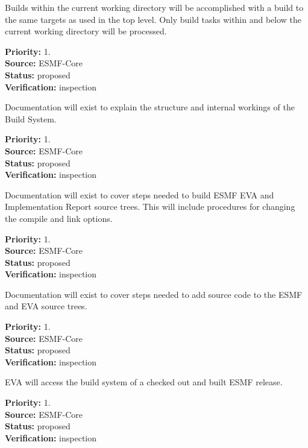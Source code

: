 Builds within the current working directory will be
accomplished with a build to the same targets as
used in the top level.
Only build tasks within and below the current working directory
will be processed.  
\begin{reqlist}
{\bf Priority:} 1. \\
{\bf Source:} ESMF-Core \\
{\bf Status:} proposed \\
{\bf Verification:} inspection
\end{reqlist}

Documentation will exist to explain the structure and 
internal workings of the Build System.
\begin{reqlist}
{\bf Priority:} 1. \\
{\bf Source:} ESMF-Core \\
{\bf Status:} proposed \\
{\bf Verification:} inspection
\end{reqlist}

Documentation will exist to cover steps needed to build ESMF
EVA and Implementation Report  source trees.  This will include procedures for 
changing the compile and link options.
\begin{reqlist}
{\bf Priority:} 1. \\
{\bf Source:} ESMF-Core \\
{\bf Status:} proposed \\
{\bf Verification:} inspection
\end{reqlist}

Documentation will exist to cover steps needed to add source
code to the ESMF and EVA source trees.
\begin{reqlist}
{\bf Priority:} 1. \\
{\bf Source:} ESMF-Core \\
{\bf Status:} proposed \\
{\bf Verification:} inspection
\end{reqlist}

EVA will access the build system
of a checked out and built  ESMF release.
\begin{reqlist}
{\bf Priority:} 1. \\
{\bf Source:} ESMF-Core \\
{\bf Status:} proposed \\
{\bf Verification:} inspection
\end{reqlist}


